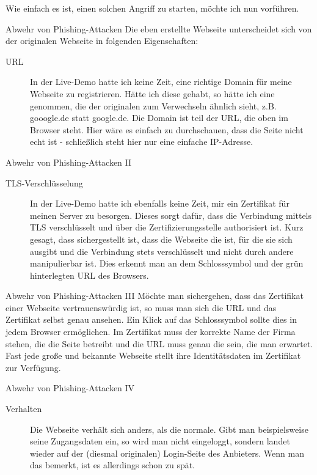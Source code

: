 \documentclass[utf8]{beamer}
\begin{document}
	\begin{frame}
		Wie einfach es ist, einen solchen Angriff zu starten, möchte ich nun vorführen.
	\end{frame}
	
	\begin{frame}{Abwehr von Phishing-Attacken}
		Die eben erstellte Webseite unterscheidet sich von der originalen Webseite in folgenden Eigenschaften:		
		\begin{description}
			\item[URL] {In der Live-Demo hatte ich keine Zeit, eine richtige Domain für meine Webseite zu registrieren. Hätte ich diese gehabt, so hätte ich eine genommen, die der originalen zum Verwechseln ähnlich sieht, z.B. gooogle.de statt google.de.
			Die Domain ist teil der URL, die oben im Browser steht.
			Hier wäre es einfach zu durchschauen, dass die Seite nicht echt ist - schließlich steht hier nur eine einfache IP-Adresse.}
		\end{description}
	\end{frame}

	\begin{frame}{Abwehr von Phishing-Attacken II}
		\begin{description}
			\item[TLS-Verschlüsselung] {In der Live-Demo hatte ich ebenfalls keine Zeit, mir ein Zertifikat für meinen Server zu besorgen. Dieses sorgt dafür, dass die Verbindung mittels TLS verschlüsselt und über die Zertifizierungsstelle authorisiert ist. Kurz gesagt, dass sichergestellt ist, dass die Webseite die ist, für die sie sich ausgibt und die Verbindung stets verschlüsselt und nicht durch andere manipulierbar ist. Dies erkennt man an dem Schlosssymbol und der grün hinterlegten URL des Browsers.}			
		\end{description}
	\end{frame}
	
	\begin{frame}{Abwehr von Phishing-Attacken III}
		Möchte man sichergehen, dass das Zertifikat einer Webseite vertrauenswürdig ist, so muss man sich die URL und das Zertifikat selbst genau ansehen. Ein Klick auf das Schlosssymbol sollte dies in jedem Browser ermöglichen.
		Im Zertifikat muss der korrekte Name der Firma stehen, die die Seite betreibt und die URL muss genau die sein, die man erwartet. Fast jede große und bekannte Webseite stellt ihre Identitätsdaten im Zertifikat zur Verfügung.
	\end{frame}
	
	\begin{frame}{Abwehr von Phishing-Attacken IV}
		\begin{description}
			\item[Verhalten] {Die Webseite verhält sich anders, als die normale. Gibt man beispielsweise seine Zugangsdaten ein, so wird man nicht eingeloggt, sondern landet wieder auf der (diesmal originalen) Login-Seite des Anbieters. Wenn man das bemerkt, ist es allerdings schon zu spät.}
		\end{description}
	\end{frame}
	
\end{document}
